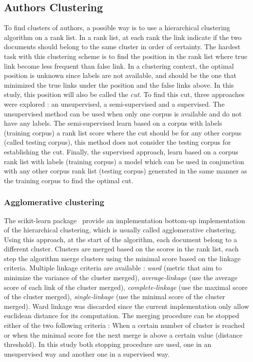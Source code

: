 \subsection{Authors Clustering \label{sec:authors_clustering}}

To find clusters of authors, a possible way is to use a hierarchical clustering algorithm on a rank list.
In a rank list, at each rank the link indicate if the two documents should belong to the same cluster in order of certainty.
The hardest task with this clustering scheme is to find the position in the rank list where true link become less frequent than false link.
In a clustering context, the optimal position is unknown since labels are not available, and should be the one that minimized the true links under the position and the false links above.
In this study, this position will also be called the \textit{cut}.
To find this cut, three approaches were explored : an unsupervised, a semi-supervised and a supervised.
The unsupervised method can be used when only one corpus is available and do not have any labels.
The semi-supervised learn based on a corpus with labels (training corpus) a rank list score where the cut should be for any other corpus (called testing corpus), this method does not consider the testing corpus for establishing the cut.
Finally, the supervised approach, learn based on a corpus rank list with labels (training corpus) a model which can be used in conjunction with any other corpus rank list (testing corpus) generated in the same manner as the training corpus to find the optimal cut.

\subsubsection{Agglomerative clustering}

The scikit-learn package~\cite{sklearn} provide an implementation bottom-up implementation of the hierarchical clustering, which is usually called agglomerative clustering.
Using this approach, at the start of the algorithm, each document belong to a different cluster.
Clusters are merged based on the scores in the rank list, each step the algorithm merge clusters using the minimal score based on the linkage criteria.
Multiple linkage criteria are available : \textit{ward} (metric that aim to minimize the variance of the cluster merged), \textit{average-linkage} (use the average score of each link of the cluster merged), \textit{complete-linkage} (use the maximal score of the cluster merged), \textit{single-linkage} (use the minimal score of the cluster merged).
Ward linkage was discarded since the current implementation only allow euclidean distance for its computation.
The merging procedure can be stopped either of the two following criteria : When a certain number of cluster is reached or when the minimal score for the next merge is above a certain value (distance threshold).
In this study both stopping procedure are used, one in an unsupervised way and another one in a supervised way.

